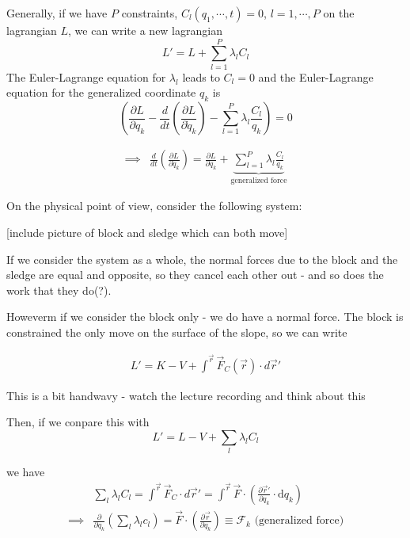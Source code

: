 \documentclass[11pt]{article}
\begin{document}
\vskip 0.5cm
\begin{redbox}
  Generally, if we have $P$ constraints, $C_{l}(q_1, \cdots, t) = 0$, $l = 1, \cdots, P$ on the lagrangian $L$, we can write a new lagrangian 
  \[ L' = L + \sum_{l = 1}^{P} \lambda_l C_l \]
  The Euler-Lagrange equation for $\lambda_l$ leads to $C_l = 0$ and the Euler-Lagrange equation for the generalized coordinate $q_k$ is 
  \[ \left( \frac{\partial L }{\partial q_{k}} - \frac{d}{dt} \left( \frac{\partial L}{\partial \dot{q}_{k}} \right) - \sum_{l = 1}^{P} \lambda_l \frac{C_l}{q_k} \right) = 0 \] 

  \begin{align*}
    \implies& \frac{d}{dt} \left( \frac{\partial L}{\partial \dot{q}_{k}} \right) = \frac{\partial L }{\partial q_{k}} + \underbrace{\sum_{l = 1}^{P} \lambda_l \frac{C_l}{q_k} }_{\text{generalized force}}
  \end{align*}
\end{redbox}

On the physical point of view, consider the following system:

\vskip 0.5cm
[include picture of block and sledge which can both move]
\vskip 0.5cm

If we consider the system as a whole, the normal forces due to the block and the sledge are equal and opposite, so they cancel each other out - and so does the work that they do(?).

\vskip 0.5cm
Howeverm if we consider the block only - we do have a normal force. The block is constrained the only move on the surface of the slope, so we can write 

\begin{align*}
  L' = K - V + \int^{\vec{r}} \vec{F}_C(\vec{r}) \cdot d\vec{r}'
\end{align*}

\begin{thought}
  {This is a bit handwavy - watch the lecture recording and think about this}
\end{thought}

Then, if we conpare this with 
\[ L' = L - V + \sum_{l} \lambda_l C_l \]

we have 
\begin{align*}
  &\sum_{l} \lambda_l C_l = \int^{\vec{r}} \vec{F}_C \cdot d\vec{r}' = \int^{\vec{r}} \vec{F} \cdot \left( \frac{\partial \vec{r}'}{\partial q_k} \cdot \mathrm{d}q_k \right) \\
  \implies& \frac{\partial}{\partial q_k} \left( \sum_{l} \lambda_l c_l \right) = \vec{F} \cdot \left( \frac{\partial \vec{r}}{\partial q_{k}} \right) \equiv \mathcal{F}_k \text{  (generalized force)}
\end{align*}
\end{document}
